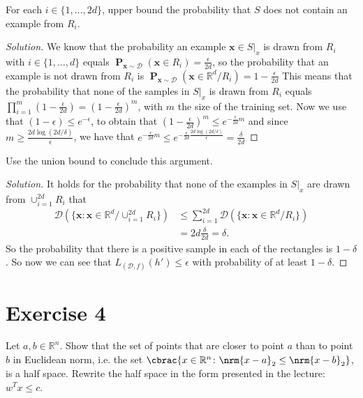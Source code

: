 \documentclass[10pt, a4paper, twoside]{amsart}
\newcommand{\R}{\ensuremath{\mathbb{R}}}
\DeclarePairedDelimiter\cbrac\{\}
\DeclarePairedDelimiter{\nrm}\lVert\rVert
\renewcommand{\c}{\ensuremath{\colon}}
\renewcommand{\P}{\operatorname*{\ensuremath{\mathbf{P}}}}
\newenvironment{solution}
               {\let\oldqedsymbol=\qedsymbol
                \renewcommand{\qedsymbol}{$\blacktriangleleft$}
                \begin{proof}[Solution]}
               {\end{proof}
                \renewcommand{\qedsymbol}{\oldqedsymbol}}
\begin{document}
For each $i \in \{1,\ldots,2d\}$, upper bound the probability that $S$ does not contain an example from $R_i$.\\
\begin{solution}
  We know that the probability an example $\mathbf{x} \in S|_x$ is drawn from $R_i$ with $i \in \{1,\ldots, d\}$ equals $\P_{\mathbf{x}\sim\mathcal{D}}(\mathbf{x}\in R_i) = \frac{\epsilon}{2d}$, so the probability that an example is not drawn from $R_i$ is $\P_{\mathbf{x}\sim\mathcal{D}}(\mathbf{x}\in \R^d/R_i) = 1-\frac{\epsilon}{2d}$ This means that the probability that none of the samples in $S|_x$ is drawn from $R_i$ equals $\prod_{i = 1}^m(1-\frac{\epsilon}{2d}) = (1-\frac{\epsilon}{2d})^m$, with $m$ the size of the training set. Now we use that $(1-\epsilon)\leq e^{-\epsilon}$, to obtain that $(1-\frac{\epsilon}{2d})^m \leq e^{- \frac{\epsilon}{2d}m}$ and since $m \geq \frac{2d\log (2d/\delta)}{\epsilon}$, we have that $e^{- \frac{\epsilon}{2d}m} \leq e^{-\frac{\epsilon}{2d}\frac{2d\log (2d/\delta)}{\epsilon}}= \frac{\delta}{2d}$
\end{solution}
Use the union bound to conclude this argument. \\
\begin{solution}
  It holds for the probability that none of the examples in $S|_x$ are drawn from $\cup_{i=1}^{2d} R_i$  that
\begin{align*}
  \mathcal{D}(\{\mathbf{x}:\mathbf{x}\in \R^d/\cup_{i=1}^{2d} R_i\}) & \leq \sum_{i=1}^{2d} \mathcal{D}(\{\mathbf{x}:\mathbf{x}\in \R^d/R_i\}) \\
                                                                                 & = 2d\frac{\delta}{2d} = \delta.
\end{align*}
So the probability that there is a positive sample in each of the rectangles is $1-\delta$. So now we can see that $L_{(\mathcal{D},f)}(h')\leq \epsilon$ with probability of at least $1 - \delta$.
\end{solution}

\section*{Exercise 4}
Let $a, b \in \R^n$. 
Show that the set of points that are closer to point $a$ than to point $b$ in Euclidean norm, 
i.e. the set $\cbrac{x \in \R^n \c \nrm{x-a}_2 \leq \nrm{x-b}_2}$, is a half space. 
Rewrite the half space in the form presented in the lecture: $w^T x \leq c$.
\end{document}
